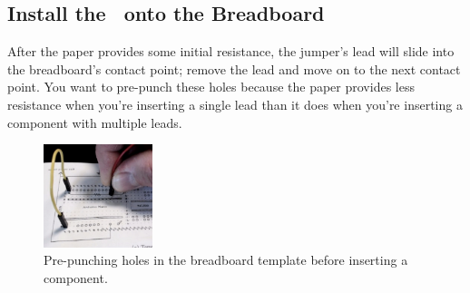 \subsection{Install the \developmentboard\ onto the Breadboard}

    \begin{description}
    \end{description}

    After the paper provides some initial resistance, the jumper's lead will slide into the breadboard's contact point;
    remove the lead and move on to the next contact point.
    You want to pre-punch these holes because the paper provides less resistance when you're inserting a single lead than it does when you're inserting a component with multiple leads.

    \begin{figure}
        \centering
        \includegraphics[height=3cm]{microcontroller/breadboard/prepunching}
        \caption{Pre-punching holes in the breadboard template before inserting a component.} \label{fig:prepunching}
    \end{figure}

